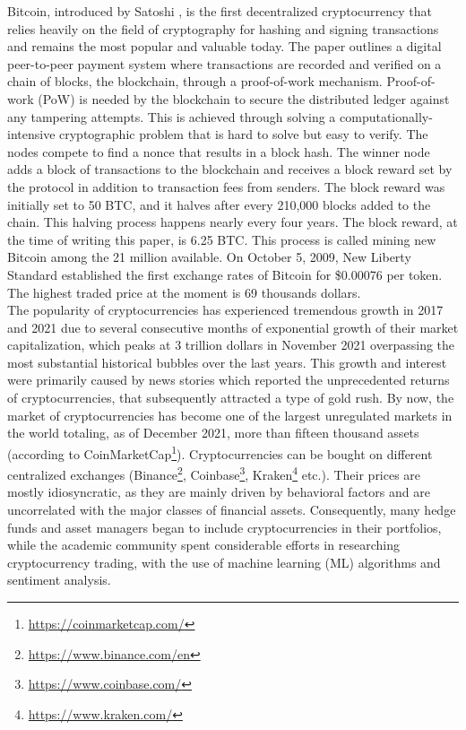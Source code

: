 \documentclass{article}
\begin{document}
	Bitcoin, introduced by Satoshi \cite{baptp}, is the first decentralized cryptocurrency that relies heavily on the field of cryptography for hashing and signing transactions and remains the most popular and valuable today. The paper outlines a digital peer-to-peer payment system where transactions are recorded and verified on a chain of blocks, the blockchain, through a proof-of-work mechanism. Proof-of-work (PoW) is needed by the blockchain to secure the distributed ledger against any tampering attempts. This is achieved through solving a computationally-intensive cryptographic problem that is hard to solve but easy to verify. The nodes compete to find a nonce that results in a block hash. The winner node adds a block of transactions to the blockchain and receives a block reward set by the protocol in addition to transaction fees from senders. The block reward was initially set to 50 BTC, and it halves after every 210,000 blocks added to the chain. This halving process happens nearly every four years. The block reward, at the time of writing this paper, is 6.25 BTC. This process is called mining new Bitcoin among the 21 million available. On October 5, 2009, New Liberty Standard established the first exchange rates of Bitcoin for \$0.00076 per token. The highest traded price at the moment is 69 thousands dollars. \\
	
	The popularity of cryptocurrencies has experienced tremendous growth in 2017 and 2021 due to several consecutive months of exponential growth of their market capitalization, which peaks at 3 trillion dollars in November 2021 overpassing the most substantial historical bubbles over the last years. This growth and interest were primarily caused by news stories which reported the unprecedented returns of cryptocurrencies, that subsequently attracted a type of gold rush. By now, the market of cryptocurrencies has become one of the largest unregulated markets in the world totaling, as of December 2021, more than fifteen thousand assets (according to CoinMarketCap\footnote{\href{https://coinmarketcap.com/}{https://coinmarketcap.com/}}). Cryptocurrencies can be bought on different centralized exchanges (Binance\footnote{\href{https://www.binance.com/en}{https://www.binance.com/en}}, Coinbase\footnote{\href{https://www.coinbase.com/}{https://www.coinbase.com/}}, Kraken\footnote{\href{https://www.kraken.com/}{https://www.kraken.com/}} etc.). Their prices are mostly idiosyncratic, as they are mainly driven by behavioral factors and are uncorrelated with the major classes of financial assets. Consequently, many hedge funds and asset managers began to include cryptocurrencies in their portfolios, while the academic community spent considerable efforts in researching cryptocurrency trading, with the use of machine learning (ML) algorithms and sentiment analysis.
	
\end{document}

